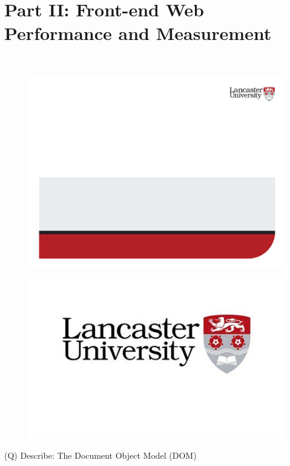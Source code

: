 \documentclass[12pt]{article}
\begin{document}
\section{Part II: Front-end Web Performance and Measurement}
\\
\begin{figure}[H]
\includegraphics[width=0.5\linewidth]{page31-image-1.png}
\end{figure}
\begin{figure}[H]
\includegraphics[width=0.5\linewidth]{page31-image-2.png}
\end{figure}
\clearpage
(Q)
Describe: The Document Object Model (DOM)
\clearpage
\end{document}
